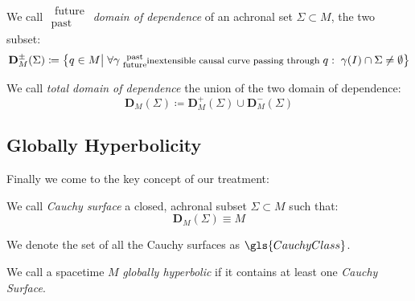 \documentclass[Main]{subfiles}
\begin{document}
			\begin{definition}
				We call \emph{$\substack{\textrm{ future}\\ \textrm{past } } $ domain of dependence} of an achronal set  $\Sigma \subset M$, the two subset:
				\begin{displaymath}		
					\mathbf{D}_M^\pm(\Sigma) \coloneqq \big\{ q \in M \big\vert \; \forall \gamma \substack{\textrm{ past}\\ \textrm{ future} }\textrm{\footnotesize inextensible causal curve passing through }q : \; \gamma(I) \cap \Sigma \neq \emptyset  \big\}
				\end{displaymath}		
			\end{definition}
			We call \emph{total domain of dependence} the union of the two domain of dependence:
			$$\mathbf{D}_M(\Sigma)  \coloneqq \mathbf{D}_M^+(\Sigma) \cup \mathbf{D}_M^-(\Sigma)$$ 
		
		\subsection{Globally Hyperbolicity}
			Finally we come to the key concept of our treatment:
			
			\begin{definition}
				We call \emph{Cauchy surface} a closed, achronal subset $\Sigma \subset M$ such that:
				\begin{displaymath}
					\mathbf{D}_M(\Sigma) \equiv M
				\end{displaymath}
			\end{definition}
				We denote the set of all the Cauchy surfaces as $\gls{CauchyClass}$.
		\begin{definition}\label{Def:GHSP}
			We call a spacetime $M$ \emph{globally hyperbolic} if it contains at least one \emph{Cauchy Surface}.
		\end{definition}
\end{document}
